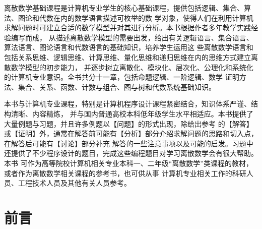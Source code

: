 \documentclass[a4paper]{ctexbook}
\theoremstyle{plain}
\begin{document}
\vspace{+0.8em}离散数学基础课程是计算机专业学生的核心基础课程，提供包括逻辑、集合、算法、图论和代数在内的数学语言描述可枚举的数
学对象，使得人们在利用计算机求解问题时可建立合适的数学模型并对其进行分析。本书根据作者多年教学实践经验编写而成，
从描述离散数学模型的需要出发，给出有关逻辑语言、集合语言、算法语言、图论语言和代数语言的基础知识，培养学生运用这
些离散数学语言和包括关系思维、逻辑思维、计算思维、量化思维和递归思维在内的思维方式建立离散数学模型的初步能力，
并逐步树立离散化、模块化、层次化、公理化和系统化的计算机专业意识。全书共分十一章，包括命题逻辑、一阶逻辑、数学
证明方法、集合、关系、函数、计数与组合、图与树和代数系统基础知识。

\vspace{+0.8em}本书与计算机专业课程，特别是计算机程序设计课程紧密结合，知识体系严谨、结构清晰、内容精炼，
并与国内普通高校本科低年级学生水平相适应。本书提供了大量例题与习题，并且许多例题以【问题】的形式出现，除给出参考
的【解答】或【证明】外，通常在解答前可能有【分析】部分介绍求解问题的思路和切入点，在解答后可能有【讨论】部分补充
解答的一些注意事项以及可能的启发。习题中还提供了不少程序设计的题目，完成这些编程题目对学习离散数学会有很大帮助。本书
可作为高等院校计算机相关专业本科一、二年级“离散数学”类课程的教材，或者作为离散数学相关课程的参考书，也可供从事
计算机专业相关工作的科研人员、工程技术人员及其他有关人员参考。


\vspace{+2.5em}



\frontmatter

\chapter{前言}


\tableofcontents

\mainmatter

%















\end{document}
